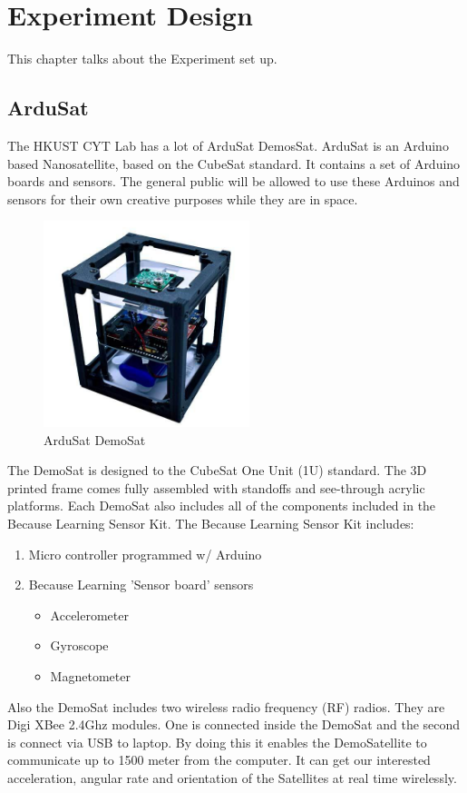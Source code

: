 \chapter{Experiment Design}\label{sec-DOE}
This chapter talks about the Experiment set up.
\section{ArduSat}
The HKUST CYT Lab has a lot of ArduSat DemosSat. ArduSat is an Arduino based Nanosatellite, based on the CubeSat standard. It contains a set of Arduino boards and sensors. The general public will be allowed to use these Arduinos and sensors for their own creative purposes while they are in space. 
\begin{figure}[ht]
\centering
\includegraphics[width=6cm]{fig/DOE/Demosat}
\caption{ArduSat DemoSat}
\end{figure}
The DemoSat is designed to the CubeSat One Unit (1U) standard. The 3D printed frame comes fully assembled with standoffs and see-through acrylic platforms. Each DemoSat also includes all of the components included in the Because Learning Sensor Kit. The Because Learning Sensor Kit includes:
\begin{enumerate}
\item Micro controller programmed w/ Arduino 
\item Because Learning 'Sensor board' sensors 
\begin{itemize}
\item Accelerometer
\item Gyroscope
\item Magnetometer
\end{itemize}
\end{enumerate} 
Also the DemoSat includes two wireless radio frequency (RF) radios. They are Digi XBee 2.4Ghz modules. One is connected inside the DemoSat and the second is connect via USB to laptop. By doing this it enables the DemoSatellite to communicate up to 1500 meter from the computer.
It can get our interested acceleration, angular rate and orientation of the Satellites at real time wirelessly.
